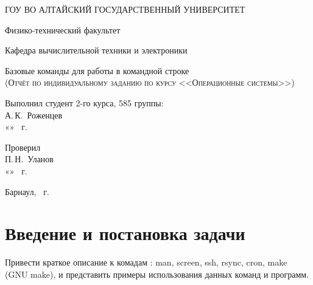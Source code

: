 \documentclass[a4paper,14pt]{extarticle}
\begin{document}
\begin{titlepage}
  \begin{center}
    ГОУ ВО АЛТАЙСКИЙ ГОСУДАРСТВЕННЫЙ УНИВЕРСИТЕТ
    \vspace{0.25cm}
    
    Физико-технический факультет
    
    Кафедра вычислительной техники и электроники
    \vfill
    
    {\LARGE Базовые команды для работы в командной строке}\\[5mm]
    \textsc{(Отчёт по индивидуальному заданию по курсу <<Операционные системы>>)}
  \bigskip

\end{center}
\vfill

\newlength{\ML}
\hfill\begin{minipage}{0.4\textwidth}
  Выполнил студент 2-го курса, 585 группы:\\
  \underline{\hspace{\ML}} А.\,К.~Роженцев\\
  «\underline{\hspace{0.7cm}}» \underline{\hspace{2cm}} \the\year~г.
\end{minipage}%
\bigskip

\hfill\begin{minipage}{0.4\textwidth}
  Проверил\\
  \underline{\hspace{\ML}} П.\,Н.~Уланов\\
  «\underline{\hspace{0.7cm}}» \underline{\hspace{2cm}} \the\year~г.
\end{minipage}%
\vfill

\begin{center}
  Барнаул, \the\year~г.
\end{center}
\end{titlepage}


\tableofcontents

\section{Введение и постановка задачи}
Привести краткое описание к комадам : man, screen, ssh, rsync, cron, make (GNU make), и представить примеры использования данных команд и программ.
\end{document}
